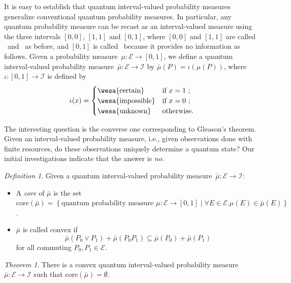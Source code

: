 \documentclass{article}
\theoremstyle{remark}
\newtheorem{definition}{Definition}
\newtheorem{thm}{Theorem}
\newcommand{\events}{\ensuremath{\mathcal{E}}}
\newcommand{\pmeas}{\ensuremath{\mu}}
\newcommand{\imposs}{{\mbox{\wesa{impossible}}}}
\newcommand{\necess}{{\mbox{\wesa{certain}}}}
\newcommand{\unknown}{{\mbox{\wesa{unknown}}}}
\begin{document}
It is easy to establish that quantum interval-valued probability
measures generalize conventional quantum probability measures. In
particular, any quantum probability measure can be recast as an
interval-valued measure using the three intervals $\left[0,0\right]$,
$\left[1,1\right]$ and \emph{$\left[0,1\right]$}, where
$\left[0,0\right]$ and $\left[1,1\right]$ are called \imposs~and
\necess~as before, and \emph{$\left[0,1\right]$} is called
\unknown~because it provides no information as follows. Given a
probability measure~$\mu:\events\rightarrow\left[0,1\right]$, we
define a quantum interval-valued probability
measure~$\bar{\mu}:\events\rightarrow\mathscr{I}$ by
$\bar{\mu}(P)=\iota\left(\mu(P)\right)$, where
$\iota:\left[0,1\right]\rightarrow\mathscr{I}$ is defined by
\[
\iota(x)=\begin{cases}
\necess & \textrm{if }x=1\textrm{ ;}\\
\imposs & \textrm{if }x=0\textrm{ ;}\\
\unknown & \textrm{otherwise.}
\end{cases}
\]

The interesting question is the converse one corresponding to
Gleason's theorem. Given an interval-valued probability measure, i.e.,
given observations done with finite resources, do these observations
uniquely determine a quantum state? Our initial investigations
indicate that the answer is \emph{no}.

\begin{definition}
  Given a quantum interval-valued probability
  measure~$\bar{\mu}:\events\rightarrow\mathscr{I}$:
\begin{itemize}
\item A \emph{core} of $\bar{\mu}$ is the set $\mathrm{core}\left(\bar{\mu}\right)=\left\{ \textrm{quantum probability measure }\pmeas:\events\rightarrow[0,1]\middle|\forall E\in\events.\pmeas\left(E\right)\in\bar{\mu}\left(E\right)\right\} $.
\item $\bar{\mu}$ is called convex if 
\begin{equation}
  \bar{\mu}\left(P_{0}\vee P_{1}\right)+\bar{\mu}\left(P_{0}P_{1}\right)\subseteq\bar{\mu}\left(P_{0}\right)+\bar{\mu}\left(P_{1}\right)\label{eq:QuantumInterval-valuedProbability-Convex}
\end{equation}
 for all commuting $P_{0},P_{1}\in\events$. 
\end{itemize}
\end{definition}

\begin{thm}\label{def:EmptyCoreQuantumInterval-valuedProbability}
There is a convex quantum interval-valued probability measure~$\bar{\mu}:\events\rightarrow\mathscr{I}$
such that $\mathrm{core}\left(\bar{\mu}\right)=\emptyset$.
\end{thm}
\end{document}
